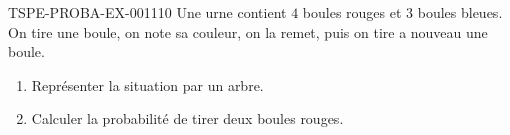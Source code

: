 \begin{exercice}{TSPE-PROBA-EX-001}{1}{10}
Une urne contient $4$ boules rouges et $3$ boules bleues. On tire une boule, on note sa couleur, on la remet, puis on tire a nouveau une boule.
\begin{enumerate}
  \item Représenter la situation par un arbre.
  \item Calculer la probabilité de tirer deux boules rouges.
\end{enumerate}
\end{exercice}

